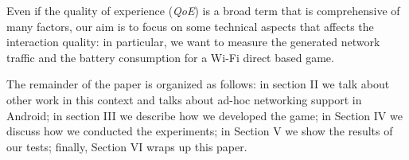 Even if the quality of experience (\textit{QoE}) is a broad term that is
comprehensive of many factors\cite{bib:moeller-qoe}, our aim is to focus on
some technical aspects that affects the interaction quality: in particular, we
want to measure the generated network traffic and the battery consumption for
a Wi-Fi direct based game.

The remainder of the paper is organized as follows: in section II we talk about
other work in this context and talks about ad-hoc networking support in Android;
in section III we describe how we developed the game; in Section IV we discuss
how we conducted the experiments; in Section V we show the results of our tests;
finally, Section VI wraps up this paper.
